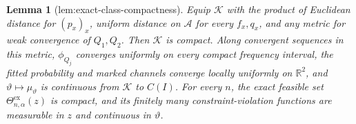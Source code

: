 \documentclass{article}
\newtheorem{lemma}{Lemma}
\begin{document}
\begin{lemma}[lem:exact-class-compactness]\label{lem:exact-class-compactness}
Equip \(\mathscr K\) with the product of Euclidean distance for \((p_x)_x\),
uniform distance on \(\mathcal A\) for every \(f_x,q_x\), and any metric for
weak convergence of \(Q_1,Q_2\).  Then \(\mathscr K\) is compact.  Along
convergent sequences in this metric, \(\phi_{Q_j}\) converges uniformly on
every compact frequency interval, the fitted probability and marked channels
converge locally uniformly on \(\mathbb R^2\), and
\(\vartheta\mapsto\mu_\vartheta\) is continuous from \(\mathscr K\) to
\(C(I)\).  For every \(n\), the exact feasible set
\(\Theta^{\mathrm{ex}}_{n,\alpha}(z)\) is compact, and its finitely many
constraint-violation functions are measurable in \(z\) and continuous in
\(\vartheta\).
\end{lemma}
\end{document}
